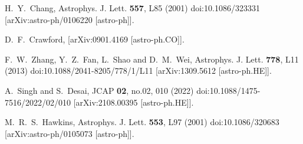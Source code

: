 \documentclass[jkps,preprint,fleqn]{revtex4} %
\begin{document}
\begin{thebibliography}{999}
H.~Y.~Chang,
Astrophys. J. Lett. \textbf{557}, L85 (2001)
doi:10.1086/323331
[arXiv:astro-ph/0106220 [astro-ph]].


D.~F.~Crawford,
[arXiv:0901.4169 [astro-ph.CO]].

F.~W.~Zhang, Y.~Z.~Fan, L.~Shao and D.~M.~Wei,
Astrophys. J. Lett. \textbf{778}, L11 (2013)
doi:10.1088/2041-8205/778/1/L11
[arXiv:1309.5612 [astro-ph.HE]].


A.~Singh and S.~Desai,
JCAP \textbf{02}, no.02, 010 (2022)
doi:10.1088/1475-7516/2022/02/010
[arXiv:2108.00395 [astro-ph.HE]].



M.~R.~S.~Hawkins,
Astrophys. J. Lett. \textbf{553}, L97 (2001)
doi:10.1086/320683
[arXiv:astro-ph/0105073 [astro-ph]].


\end{thebibliography}
\end{document}
